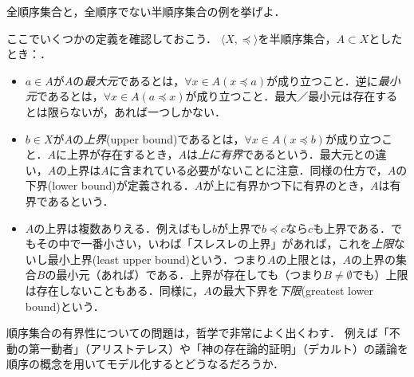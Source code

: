 \documentclass[11pt,a4paper]{jsarticle}
\begin{document}
\begin{exercise}
 全順序集合と，全順序でない半順序集合の例を挙げよ．
\end{exercise}

ここでいくつかの定義を確認しておこう．
$\langle X, \preceq \rangle$を半順序集合，$A \subset X$としたとき：．
\begin{itemize}
 \item $a \in A$が$A$の\emph{最大元}であるとは，$\forall x \in A (x \preceq a)$が成り立つこと．逆に\emph{最小元}であるとは，$\forall x \in A (a \preceq x)$が成り立つこと．最大／最小元は存在するとは限らないが，あれば一つしかない．
 \item $b \in X$が$A$の\emph{上界}(upper bound)であるとは，$\forall x \in A (x \preceq b)$が成り立つこと．$A$に上界が存在するとき，$A$は\emph{上に有界}であるという．最大元との違い，$A$の上界は$A$に含まれている必要がないことに注意．同様の仕方で，$A$の下界(lower bound)が定義される．$A$が上に有界かつ下に有界のとき，$A$は有界であるという．
 \item $A$の上界は複数ありえる．例えばもし$b$が上界で$b \preceq c$なら$c$も上界である．でもその中で一番小さい，いわば「スレスレの上界」があれば，これを\emph{上限}ないし最小上界(least upper bound)という．つまり$A$の上限とは，$A$の上界の集合$B$の最小元（あれば）である．上界が存在しても（つまり$B \neq \emptyset$でも）上限は存在しないこともある．同様に，$A$の最大下界を\emph{下限}(greatest lower bound)という．
\end{itemize}

\begin{example}
順序集合の有界性についての問題は，哲学で非常によく出くわす．
例えば「不動の第一動者」（アリストテレス）や「神の存在論的証明」（デカルト）の議論を順序の概念を用いてモデル化するとどうなるだろうか．
\end{example}
\end{document}
